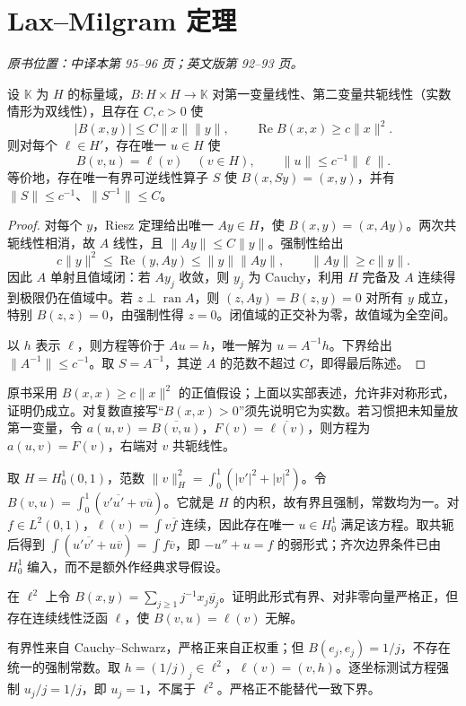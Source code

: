 \section{Lax--Milgram 定理}\label{sec:yosida-03-07}
\noindent\textit{原书位置：中译本第 95--96 页；英文版第 92--93 页。}

\begin{theorem}\label{thm:y3-lax-milgram}
设 $\mathbb K$ 为 $H$ 的标量域，$B:H\times H\to\mathbb K$ 对第一变量线性、第二变量共轭线性（实数情形为双线性），且存在 $C,c>0$ 使
\[
 |B(x,y)|\le C\|x\|\|y\|,\qquad
 \operatorname{Re}B(x,x)\ge c\|x\|^2.
\]
则对每个 $\ell\in H'$，存在唯一 $u\in H$ 使
\[
 B(v,u)=\ell(v)\quad(v\in H),\qquad
 \|u\|\le c^{-1}\|\ell\|.
\]
等价地，存在唯一有界可逆线性算子 $S$ 使 $B(x,Sy)=(x,y)$，并有 $\|S\|\le c^{-1}$、$\|S^{-1}\|\le C$。
\end{theorem}
\begin{proof}
对每个 $y$，Riesz 定理给出唯一 $Ay\in H$，使 $B(x,y)=(x,Ay)$。两次共轭线性相消，故 $A$ 线性，且 $\|Ay\|\le C\|y\|$。强制性给出
\[
 c\|y\|^2\le\operatorname{Re}(y,Ay)\le\|y\|\|Ay\|,
 \qquad \|Ay\|\ge c\|y\|.
\]
因此 $A$ 单射且值域闭：若 $Ay_j$ 收敛，则 $y_j$ 为 Cauchy，利用 $H$ 完备及 $A$ 连续得到极限仍在值域中。若 $z\perp\operatorname{ran}A$，则 $(z,Ay)=B(z,y)=0$ 对所有 $y$ 成立，特别 $B(z,z)=0$，由强制性得 $z=0$。闭值域的正交补为零，故值域为全空间。

以 $h$ 表示 $\ell$，则方程等价于 $Au=h$，唯一解为 $u=A^{-1}h$。下界给出 $\|A^{-1}\|\le c^{-1}$。取 $S=A^{-1}$，其逆 $A$ 的范数不超过 $C$，即得最后陈述。
\end{proof}

\begin{remark}[与原书表述及通常弱形式的关系]
原书采用 $B(x,x)\ge c\|x\|^2$ 的正值假设；上面以实部表述，允许非对称形式，证明仍成立。对复数直接写“$B(x,x)>0$”须先说明它为实数。若习惯把未知量放第一变量，令 $a(u,v)=\overline{B(v,u)}$，$F(v)=\overline{\ell(v)}$，则方程为 $a(u,v)=F(v)$，右端对 $v$ 共轭线性。
\end{remark}

\begin{example}
取 $H=H_0^1(0,1)$，范数 $\|v\|_H^2=\int_0^1(|v'|^2+|v|^2)$。令 $B(v,u)=\int_0^1(v'\overline{u'}+v\overline u)$。它就是 $H$ 的内积，故有界且强制，常数均为一。对 $f\in L^2(0,1)$，$\ell(v)=\int v\overline f$ 连续，因此存在唯一 $u\in H_0^1$ 满足该方程。取共轭后得到 $\int(u'\overline{v'}+u\overline v)=\int f\overline v$，即 $-u''+u=f$ 的弱形式；齐次边界条件已由 $H_0^1$ 编入，而不是额外作经典求导假设。
\end{example}

\begin{exercise}
在 $\ell^2$ 上令 $B(x,y)=\sum_{j\ge1}j^{-1}x_j\overline{y_j}$。证明此形式有界、对非零向量严格正，但存在连续线性泛函 $\ell$，使 $B(v,u)=\ell(v)$ 无解。
\end{exercise}
\begin{solution}
有界性来自 Cauchy--Schwarz，严格正来自正权重；但 $B(e_j,e_j)=1/j$，不存在统一的强制常数。取 $h=(1/j)_j\in\ell^2$，$\ell(v)=(v,h)$。逐坐标测试方程强制 $u_j/j=1/j$，即 $u_j=1$，不属于 $\ell^2$。严格正不能替代一致下界。
\end{solution}

